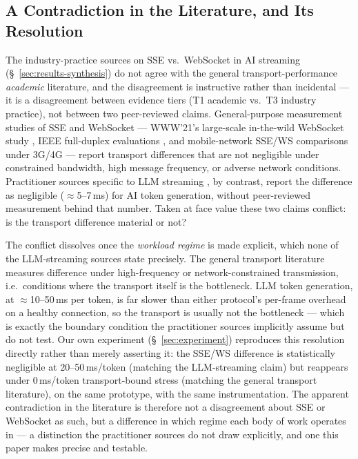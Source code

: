 \documentclass[11pt]{article}
\begin{document}
\subsection{A Contradiction in the Literature, and Its Resolution}
\label{sec:litdialogue}
The industry-practice sources on SSE vs.\ WebSocket in AI streaming (\S~\ref{sec:results-synthesis}) do not agree with the general transport-performance \emph{academic} literature, and the disagreement is instructive rather than incidental --- it is a disagreement between evidence tiers (T1 academic vs.\ T3 industry practice), not between two peer-reviewed claims. General-purpose measurement studies of SSE and WebSocket --- WWW'21's large-scale in-the-wild WebSocket study \cite{murley2021}, IEEE full-duplex evaluations \cite{ws2014,ws2019}, and mobile-network SSE/WS comparisons under 3G/4G --- report transport differences that are not negligible under constrained bandwidth, high message frequency, or adverse network conditions. Practitioner sources specific to LLM streaming \cite{buildmvpfast2026,procedure2026}, by contrast, report the difference as negligible ($\approx$5--7\,ms) for AI token generation, without peer-reviewed measurement behind that number. Taken at face value these two claims conflict: is the transport difference material or not?

The conflict dissolves once the \emph{workload regime} is made explicit, which none of the LLM-streaming sources state precisely. The general transport literature measures difference under high-frequency or network-constrained transmission, i.e.\ conditions where the transport itself is the bottleneck. LLM token generation, at $\approx$10--50\,ms per token, is far slower than either protocol's per-frame overhead on a healthy connection, so the transport is usually not the bottleneck --- which is exactly the boundary condition the practitioner sources implicitly assume but do not test. Our own experiment (\S~\ref{sec:experiment}) reproduces this resolution directly rather than merely asserting it: the SSE/WS difference is statistically negligible at 20--50\,ms/token (matching the LLM-streaming claim) but reappears under 0\,ms/token transport-bound stress (matching the general transport literature), on the same prototype, with the same instrumentation. The apparent contradiction in the literature is therefore not a disagreement about SSE or WebSocket as such, but a difference in which regime each body of work operates in --- a distinction the practitioner sources do not draw explicitly, and one this paper makes precise and testable.
\end{document}
